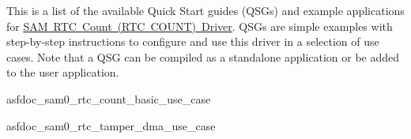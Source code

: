 This is a list of the available Quick Start guides (QSGs) and example applications for \mbox{\hyperlink{group__asfdoc__sam0__rtc__count__group}{SAM RTC Count (RTC COUNT) Driver}}. QSGs are simple examples with step-\/by-\/step instructions to configure and use this driver in a selection of use cases. Note that a QSG can be compiled as a standalone application or be added to the user application.


\begin{DoxyItemize}
\item asfdoc\+\_\+sam0\+\_\+rtc\+\_\+count\+\_\+basic\+\_\+use\+\_\+case 
\item asfdoc\+\_\+sam0\+\_\+rtc\+\_\+tamper\+\_\+dma\+\_\+use\+\_\+case 
\end{DoxyItemize}